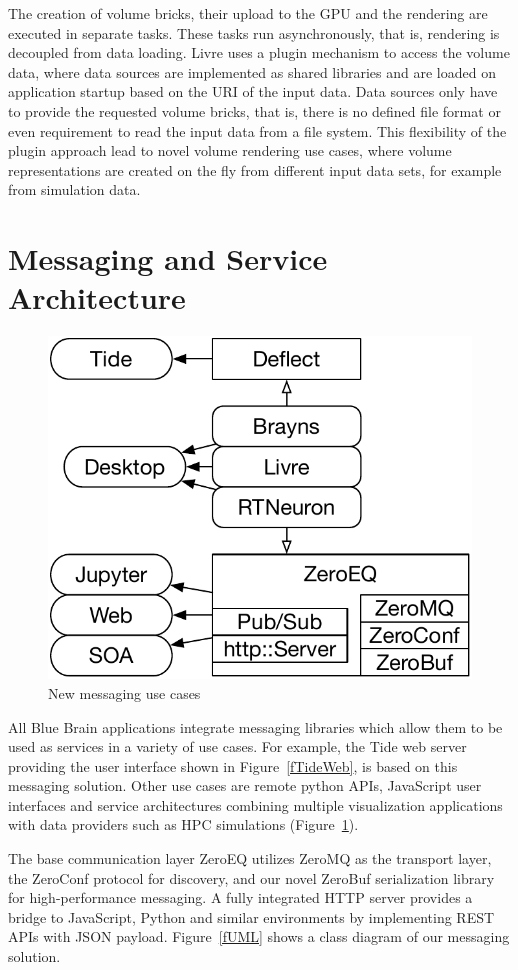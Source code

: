 \documentclass[10pt]{llncs}
\newcommand{\fig}[1]{Figure~\ref{#1}}
\begin{document}
The creation of volume bricks, their upload to the GPU and the rendering are
executed in separate tasks. These tasks run asynchronously, that is, rendering
is decoupled from data loading. Livre uses a plugin mechanism to access the
volume data, where data sources are implemented as shared libraries and are
loaded on application startup based on the URI of the input data. Data sources
only have to provide the requested volume bricks, that is, there is no defined
file format or even requirement to read the input data from a file system. This
flexibility of the plugin approach lead to novel volume rendering use cases,
where volume representations are created on the fly from different input data
sets, for example from simulation data.


\section{Messaging and Service Architecture}

\begin{figure}\center\vspace{-6ex}
  \includegraphics[width=.382\textwidth]{images/ZeroMS}
  {\caption{\label{fZero}New messaging use cases}}\vspace{-2ex}
\end{figure}

All Blue Brain applications integrate messaging libraries which allow them to be
used as services in a variety of use cases. For example, the Tide web server
providing the user interface shown in \fig{fTideWeb}, is based on this messaging
solution. Other use cases are remote python APIs, JavaScript user interfaces and
service architectures combining multiple visualization applications with data
providers such as HPC simulations (\fig{fZero}).

The base communication layer ZeroEQ utilizes ZeroMQ as the transport layer, the
ZeroConf protocol for discovery, and our novel ZeroBuf serialization library for
high-performance messaging. A fully integrated HTTP server provides a bridge to
JavaScript, Python and similar environments by implementing REST APIs with JSON
payload. \fig{fUML} shows a class diagram of our messaging solution.
\end{document}
